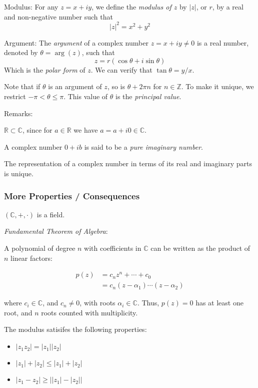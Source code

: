 \documentclass[12pt]{article}
\begin{document}
\begin{compactenum}[i)]
\setcounter{enumi}{5}
\item Modulus: For any $z = x + iy$, we define the \emph{modulus of $z$} by $|z|$, or $r$, by
    a real and non-negative number such that
    \[
    |z|^{2} = x^{2} + y^{2}
    \]
\item Argument: The \emph{argument} of a complex number $z = x + iy \ne 0$
    is a real number, denoted by $\theta = \arg(z)$, such that
    \[
        z = r(\cos \theta + i \sin \theta)
    \]
    Which is the \emph{polar form} of $z$. We can verify
    that $\tan\theta = y/x$.
\end{compactenum}

Note that if $\theta$ is an argument of $z$, so is $\theta + 2\pi n$ for $n \in \mathbb{Z}$.
To make it unique, we restrict $-\pi < \theta \le \pi$.
This value of $\theta$ is the \emph{principal value}.

Remarks:
\begin{compactenum}[(1)]
\item $\mathbb{R} \subset \mathbb{C}$, since for $a \in \mathbb{R}$ we have
    $a = a + i 0 \in \mathbb{C}$.
\item A complex number $0 + ib$ is said to be a \emph{pure imaginary number}.
\item The representation of a complex number in terms
    of its real and imaginary parts is unique.
\end{compactenum}

\subsubsection*{More Properties / Consequences}
\begin{compactenum}[(i)]
\setlength{\parskip}{4pt}
\item $(\mathbb{C},+,\cdot)$ is a field.
\item \emph{Fundamental Theorem of Algebra}:

    A polynomial of degree $n$ with coefficients in $\mathbb{C}$
    can be written as the product of $n$ linear factors:

    \[
        \begin{aligned}
            p(z) &= c_n z^{n} + \cdots + c_{0} \\
                &= c_n (z - \alpha _1)\cdots(z - \alpha_2)
        \end{aligned}
    \]
    
    where $c_i \in \mathbb{C}$, and $c_n \ne 0$, with roots $\alpha_i \in \mathbb{C}$.
    Thus, $p(z) = 0$ has at least one root,
    and $n$ roots counted with multiplicity.
\item The modulus satisifes the following properties:
    \begin{itemize}
        \item $|z_{1}z_{2}| = |z_{1}||z_{2}|$
        \item $|z_{1}| + |z_{2}| \le |z_{1}| + |z_{2}|$
        \item $|z_{1} - z_{2}| \ge \left||z_{1}| - |z_{2}|\right|$
    \end{itemize}
\end{compactenum}
\end{document}
